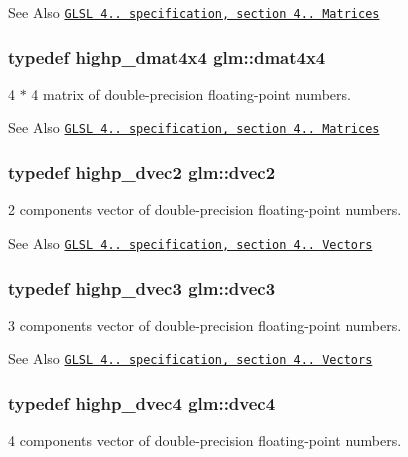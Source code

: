 \begin{DoxySeeAlso}{See Also}
\href{http://www.opengl.org/registry/doc/GLSLangSpec.4.20.8.pdf}{\tt G\-L\-S\-L 4.. specification, section 4.. Matrices} 
\end{DoxySeeAlso}
\hypertarget{group__core__types_ga54d90d4b902d93638b906571af215bb1}{
\subsubsection[{dmat4x4}]{\setlength{\rightskip}{0pt plus 5cm}typedef highp\-\_\-dmat4x4 {\bf glm\-::dmat4x4}}}\label{group__core__types_ga54d90d4b902d93638b906571af215bb1}
4 $\ast$ 4 matrix of double-\/precision floating-\/point numbers.

\begin{DoxySeeAlso}{See Also}
\href{http://www.opengl.org/registry/doc/GLSLangSpec.4.20.8.pdf}{\tt G\-L\-S\-L 4.. specification, section 4.. Matrices} 
\end{DoxySeeAlso}
\hypertarget{group__core__types_gae6727259898288cae197724d5f172b3b}{
\subsubsection[{dvec2}]{\setlength{\rightskip}{0pt plus 5cm}typedef highp\-\_\-dvec2 {\bf glm\-::dvec2}}}\label{group__core__types_gae6727259898288cae197724d5f172b3b}
2 components vector of double-\/precision floating-\/point numbers.

\begin{DoxySeeAlso}{See Also}
\href{http://www.opengl.org/registry/doc/GLSLangSpec.4.20.8.pdf}{\tt G\-L\-S\-L 4.. specification, section 4.. Vectors} 
\end{DoxySeeAlso}
\hypertarget{group__core__types_ga7f3287f952e6ccb481231368091702ac}{
\subsubsection[{dvec3}]{\setlength{\rightskip}{0pt plus 5cm}typedef highp\-\_\-dvec3 {\bf glm\-::dvec3}}}\label{group__core__types_ga7f3287f952e6ccb481231368091702ac}
3 components vector of double-\/precision floating-\/point numbers.

\begin{DoxySeeAlso}{See Also}
\href{http://www.opengl.org/registry/doc/GLSLangSpec.4.20.8.pdf}{\tt G\-L\-S\-L 4.. specification, section 4.. Vectors} 
\end{DoxySeeAlso}
\hypertarget{group__core__types_ga0824ceed7ec3b2fba89765501c1540b5}{
\subsubsection[{dvec4}]{\setlength{\rightskip}{0pt plus 5cm}typedef highp\-\_\-dvec4 {\bf glm\-::dvec4}}}\label{group__core__types_ga0824ceed7ec3b2fba89765501c1540b5}
4 components vector of double-\/precision floating-\/point numbers.

